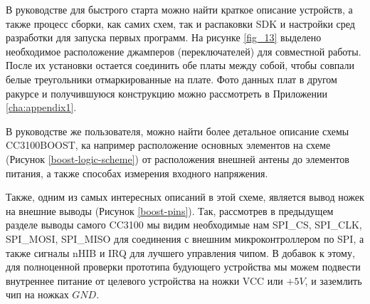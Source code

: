 В руководстве для быстрого старта можно найти краткое описание
устройств, а также процесс сборки, как самих схем, так и распаковки
SDK и настройки сред разработки для запуска первых программ.
На рисунке \ref{fig_13} выделено необходимое расположение
джамперов (переключателей) для совместной работы. После их
установки остается соединить обе платы между собой, чтобы
совпали белые треугольники отмаркированные на плате.
Фото данных плат в другом ракурсе и получившуюся конструкцию
можно рассмотреть в Приложении \ref{cha:appendix1}.

В руководстве же пользователя, можно найти более детальное
описание схемы CC3100BOOST, ка например расположение основных
элементов на схеме (Рисунок \ref{boost-logic-scheme}) от
расположения внешней антены до элементов питания, а также способах измерения входного
напряжения.
\vspace{4cm}

\clearpage

\vspace{3cm}

Также, одним из самых интересных описаний в этой схеме,
является вывод ножек на внешние выводы (Рисунок \ref{boost-pins}).
Так, рассмотрев в предыдущем разделе выводы самого CC3100
мы видим необходимые нам SPI\_CS, SPI\_CLK, SPI\_MOSI, SPI\_MISO
для соединения с внешним микроконтроллером по SPI, а также
сигналы nHIB и IRQ для лучшего управления чипом.
В добавок к этому, для полноценной проверки прототипа
будующего устройства мы можем подвести внутреннее питание
от целевого устройства на ножки VCC или $+5V$, и заземлить
чип на ножках $GND$.


